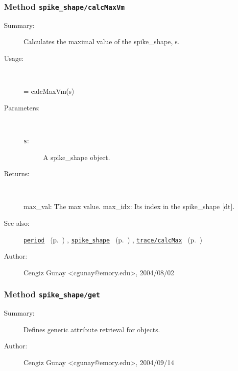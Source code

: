 \subsubsection[Method \texttt{calcMaxVm}]{Method \texttt{spike\_shape/calcMaxVm}}%
%
\label{ref_spike_shape__calcMaxVm}%
\hypertarget{ref_spike_shape__calcMaxVm}{}%
\begin{description}
\item[Summary:]Calculates the maximal value of the spike\_shape, s. 
%
\item[Usage:]~%
\begin{lyxcode}%
[max\_val, max\_idx] = calcMaxVm(s)
%
\end{lyxcode}%
%
%
\item[Parameters:]~
\begin{description}%
\item[\texttt{s}:]
 A spike\_shape object.
\end{description}%
%
\item[Returns:]~

	max\_val: The max value.
	max\_idx: Its index in the spike\_shape [dt].
%
%
\item[See also:]%
\hyperlink{ref_period}{\texttt{period}}%
\ (p.~\pageref{ref_period})%
%
, \hyperlink{ref_spike_shape}{\texttt{spike\_shape}}%
\ (p.~\pageref{ref_spike_shape})%
%
, \hyperlink{ref_trace__calcMax}{\texttt{trace/calcMax}}%
\ (p.~\pageref{ref_trace__calcMax})%
%
%
\item[Author:]%
Cengiz Gunay <cgunay@emory.edu>, 2004/08/02%
\end{description}
\methodline%
\subsubsection[Method \texttt{get}]{Method \texttt{spike\_shape/get}}%
%
\label{ref_spike_shape__get}%
\hypertarget{ref_spike_shape__get}{}%
\begin{description}
\item[Summary:]Defines generic attribute retrieval for objects.
%
%
%
%
%
%
%
\item[Author:]%
Cengiz Gunay <cgunay@emory.edu>, 2004/09/14%
\end{description}
\methodline%
